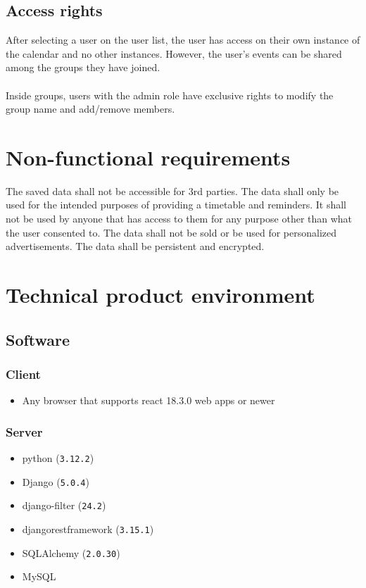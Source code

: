 \documentclass[]{article}
\begin{document}
	\subsection{Access rights}
	After selecting a user on the user list, the user has access on their own instance of the calendar and no other instances. However, the user's events can be shared among the groups they have joined.\\
	\\
	Inside groups, users with the admin role have exclusive rights to modify the group name and add/remove members.
\section{Non-functional requirements}
	The saved data shall not be accessible for 3rd parties. The data shall only be used for the intended purposes of providing a timetable and reminders. It shall not be used by anyone that has access to them for any purpose other than what the user consented to. The data shall not be sold or be used for personalized advertisements. The data shall be persistent and encrypted.
\section{Technical product environment}
	\subsection{Software}
		\subsubsection{Client}
			\begin{itemize}
				\item Any browser that supports react 18.3.0 web apps or newer
			\end{itemize}
		\subsubsection{Server}
			\begin{itemize}
				\item python (\texttt{3.12.2})
				\item Django (\texttt{5.0.4})
				\item django-filter (\texttt{24.2})
				\item djangorestframework (\texttt{3.15.1})
				\item SQLAlchemy (\texttt{2.0.30})
				\item MySQL
			\end{itemize}
\end{document}
